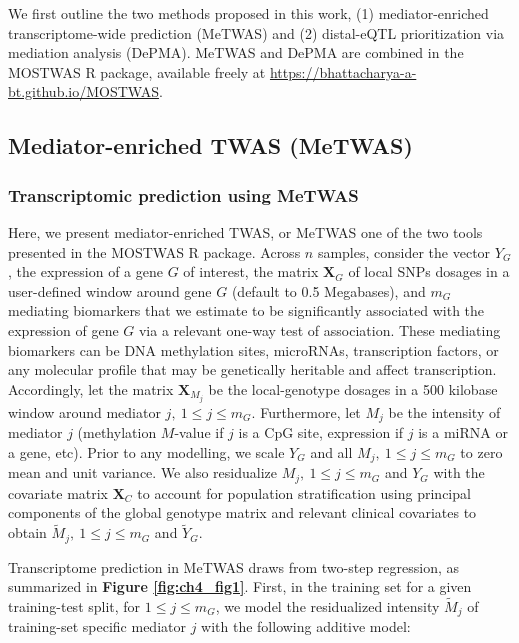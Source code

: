 We first outline the two methods
proposed in this work, (1) mediator-enriched transcriptome-wide
prediction (MeTWAS) and (2) distal-eQTL 
prioritization via mediation analysis (DePMA). 
MeTWAS and DePMA are combined
in the MOSTWAS R package,
available freely at \url{https://bhattacharya-a-bt.github.io/MOSTWAS}.

\subsection{Mediator-enriched TWAS (MeTWAS)}

\subsubsection{Transcriptomic prediction using MeTWAS}

Here, we present mediator-enriched TWAS, or MeTWAS
one of the two tools presented in the MOSTWAS R package.
Across $n$ samples, consider the vector $Y_G$,
the expression of a gene $G$ 
of interest, the matrix $\mathbf{X}_G$ 
of local SNPs dosages
in a user-defined window around gene $G$ (default to 0.5 Megabases), 
and $m_G$ mediating biomarkers that
we estimate to be significantly associated
with the expression of gene $G$ via a
relevant one-way test of association. These
mediating biomarkers can be DNA methylation sites,
microRNAs, transcription factors, or any
molecular profile that may be genetically
heritable and affect transcription. Accordingly,
let the matrix $\mathbf{X}_{M_j}$ be the 
local-genotype dosages in a 500 kilobase
window around mediator $j,~1 \leq j \leq m_G$. Furthermore,
let $M_j$ be the intensity of mediator $j$ 
(methylation $M$-value if $j$ is a CpG site,
expression if $j$ is a miRNA or a gene, etc).
Prior to any modelling, we scale $Y_G$ and all 
$M_j,~1 \leq j \leq m_G$ to zero mean and
unit variance. We also residualize
$M_j,~1 \leq j \leq m_G$ and $Y_G$ 
with the covariate matrix $\mathbf{X}_C$
to account for population stratification using
principal components of the global genotype matrix
and relevant clinical covariates to obtain
$\tilde{M}_j,~1 \leq j \leq m_G$ and $\tilde{Y}_G$.

Transcriptome prediction in MeTWAS draws from
two-step regression, as summarized in \textbf{Figure \ref{fig:ch4_fig1}}.
First, in the training set
for a given training-test split,
for $1 \leq j \leq m_G$, we model the residualized 
intensity $\tilde{M}_j$ of training-set specific 
mediator $j$ with
the following additive model:


